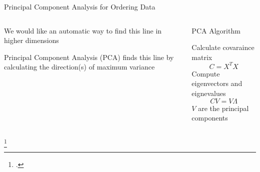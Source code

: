 \begin{frame}{Principal Component Analysis for Ordering Data}
\begin{columns}
\begin{column}{0.7\textwidth}
\begin{itemize}
{   \item We would like an automatic way to find this line in higher dimensions
      
  \item Principal Component Analysis (PCA) \footnotemark finds this line by calculating the direction(s) of maximum variance %
  \par}
  \end{itemize}
  \end{column}
  \begin{column}{0.25\textwidth}
  \begin{block}{{\small PCA Algorithm}}
 {\footnotesize
  	Calculate covaraince matrix
  	$$C =X^T X$$	
  	Compute eigenvectors and eignevalues
  	$$C V = V \Lambda$$
  	$V$ are the principal components
  \par}
  \end{block}
  \end{column}
  \end{columns}
  
  \footcitetext{shlens2005tutorial}
\end{frame}

